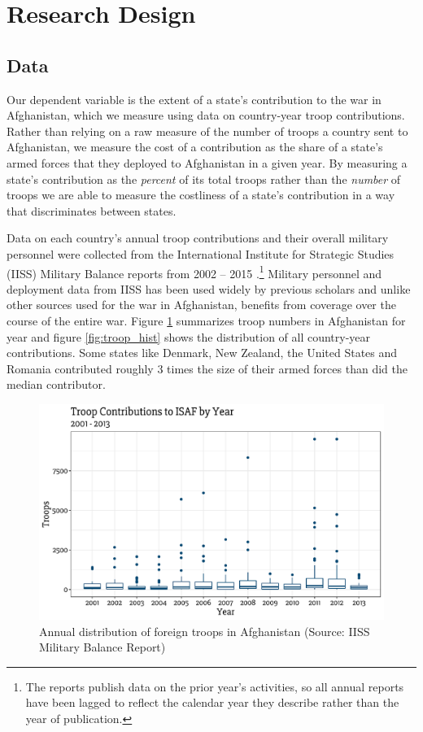 \documentclass[12pt,letterpaper]{article}
\begin{document}
\section{Research Design}
	\subsection{Data}		
		Our dependent variable is the extent of a state's contribution to the war in Afghanistan, which we measure using data on country-year troop contributions. Rather than relying on a raw measure of the number of troops a country sent to Afghanistan, we measure the cost of a contribution as the share of a state's armed forces that they deployed to Afghanistan in a given year. By measuring a state's contribution as the \emph{percent} of its total troops rather than the \emph{number} of troops we are able to measure the costliness of a state's contribution in a way that discriminates between states. 
		
		Data on each country's annual troop contributions and their overall military personnel were collected from the International Institute for Strategic Studies (IISS) Military Balance reports from 2002 -- 2015 \citep{internationalinstituteforstrategicstudies_militarybalance_}.\footnote{The reports publish data on the prior year's activities, so all annual reports have been lagged to reflect the calendar year they describe rather than the year of publication.} Military personnel and deployment data from IISS has been used widely by previous scholars \citep[e.g.][]{walter_buildingreputationwhy_2006, rovner_hegemonyforceposture_2014, beckley_emergingmilitarybalance_2017, henke_politicsdiplomacyhow_2017} and unlike other sources used for the war in Afghanistan, benefits from coverage over the course of the entire war. Figure \ref{fig:afghan_total} summarizes troop numbers in Afghanistan for year and figure \ref{fig:troop_hist} shows the distribution of all country-year contributions. Some states like Denmark, New Zealand, the United States and Romania contributed roughly 3 times the size of their armed forces than did the median contributor. 

		\begin{figure}[H]
			\centering
			\includegraphics[width = \textwidth]{figures/troop_year.pdf}
			\caption{Annual distribution of foreign troops in Afghanistan (Source: IISS Military Balance Report)}
			\label{fig:afghan_total}
		\end{figure}
		
\end{document}
